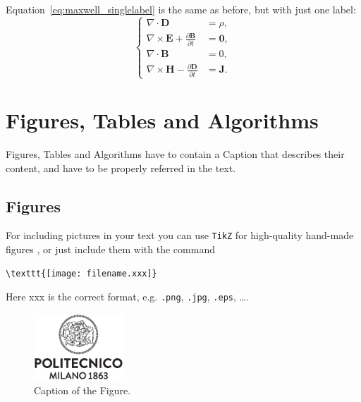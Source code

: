 \documentclass[11pt,a4paper]{article}
\begin{document}
Equation~\eqref{eq:maxwell_singlelabel} is the same as before,
but with just one label:
\begin{equation}
    \label{eq:maxwell_singlelabel}
    \left\{
    \begin{aligned}
    \nabla\cdot \bm{D} & = \rho, \\
    \nabla \times \bm{E} +  \frac{\partial \bm{B}}{\partial t} &= \bm{0},\\
    \nabla\cdot \bm{B} & = 0, \\
    \nabla \times \bm{H} - \frac{\partial \bm{D}}{\partial t} &= \bm{J}.
    \end{aligned}
    \right.
\end{equation}

\section{Figures, Tables and Algorithms}

Figures, Tables and Algorithms have to contain a Caption that describes their content, and have to be properly referred in the text.

\subsection{Figures}
\label{subsec:figures}

For including pictures in your text you can use \texttt{TikZ} for high-quality hand-made figures \cite{tikz},
or just include them with the command
\begin{verbatim}
\texttt{[image: filename.xxx]}
\end{verbatim}
Here xxx is the correct format, e.g.  \verb|.png|, \verb|.jpg|, \verb|.eps|, \dots.

\begin{figure}[H]
    \centering
    \includegraphics[width=0.3\textwidth]{logo_polimi_scritta.eps}
    \caption{Caption of the Figure.}
    \label{fig:quadtree}
\end{figure}
\end{document}
